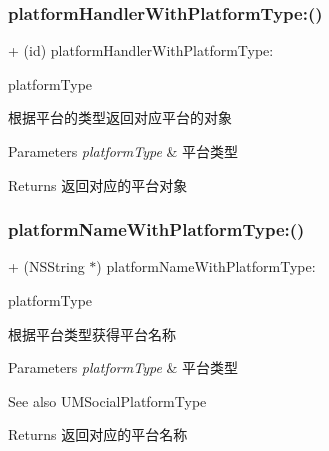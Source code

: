 \subsubsection{\texorpdfstring{platform\+Handler\+With\+Platform\+Type\+:()}{platformHandlerWithPlatformType:()}\hspace{0.1cm}{\footnotesize\ttfamily [2/2]}}
{\footnotesize\ttfamily + (id) platform\+Handler\+With\+Platform\+Type\+: \begin{DoxyParamCaption}\item[{(U\+M\+Social\+Platform\+Type)}]{platform\+Type }\end{DoxyParamCaption}}

根据平台的类型返回对应平台的对象


\begin{DoxyParams}{Parameters}
{\em platform\+Type} & 平台类型\\
\hline
\end{DoxyParams}
\begin{DoxyReturn}{Returns}
返回对应的平台对象 
\end{DoxyReturn}
\mbox{\label{interface_u_m_social_platform_config_a5ac56d539f835df37ca8299a93368433}} 
\subsubsection{\texorpdfstring{platform\+Name\+With\+Platform\+Type\+:()}{platformNameWithPlatformType:()}\hspace{0.1cm}{\footnotesize\ttfamily [1/2]}}
{\footnotesize\ttfamily + (N\+S\+String $\ast$) platform\+Name\+With\+Platform\+Type\+: \begin{DoxyParamCaption}\item[{(U\+M\+Social\+Platform\+Type)}]{platform\+Type }\end{DoxyParamCaption}}

根据平台类型获得平台名称


\begin{DoxyParams}{Parameters}
{\em platform\+Type} & 平台类型 \\
\hline
\end{DoxyParams}
\begin{DoxySeeAlso}{See also}
U\+M\+Social\+Platform\+Type
\end{DoxySeeAlso}
\begin{DoxyReturn}{Returns}
返回对应的平台名称 
\end{DoxyReturn}
\mbox{\label{interface_u_m_social_platform_config_a5ac56d539f835df37ca8299a93368433}} 

